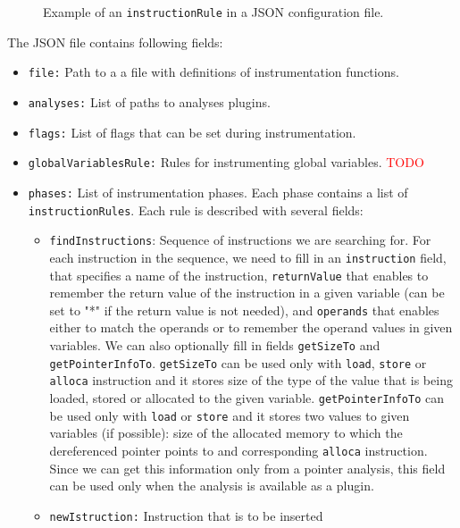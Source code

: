\begin{figure}[h]

\caption{Example of an \texttt{instructionRule} in a JSON configuration file.}
\label{fig:json_example}
\end{figure}

The JSON file contains following fields:

\medskip
\begin{itemize}
\item \texttt{file:} Path to a a file with definitions of instrumentation functions.
\item \texttt{analyses:} List of paths to analyses plugins.
\item \texttt{flags:} List of flags that can be set during instrumentation.
\item \texttt{globalVariablesRule:} Rules for instrumenting global
  variables. \textcolor{red}{TODO}
\item \texttt{phases:} List of instrumentation phases. Each phase contains a
  list of \texttt{instructionRules}. Each rule is described with several fields:
  \begin{itemize}
    \item \texttt{findInstructions}: Sequence of instructions we are searching
    for. For each instruction in the sequence, we need to fill in an
        \texttt{instruction} field, that specifies a name of the instruction,
        \texttt{returnValue} that enables to remember the return value of the
        instruction in a given variable (can be set to "*" if the return value
        is not needed), and \texttt{operands} that enables either to match the
        operands or to remember the operand values in given variables. We can
        also optionally fill in fields \texttt{getSizeTo} and
        \texttt{getPointerInfoTo}. \texttt{getSizeTo} can be used only with
        \texttt{load}, \texttt{store} or \texttt{alloca} instruction and it
        stores size of the type of the value that is being loaded, stored or
        allocated to the given variable. \texttt{getPointerInfoTo} can be used
        only with \texttt{load} or \texttt{store} and it stores two values to
        given variables (if possible): size of the allocated memory to which
        the dereferenced pointer points to and corresponding \texttt{alloca}
        instruction. Since we can get this information only from a pointer
        analysis, this field can be used only when the analysis is available as
        a plugin.
    \item \texttt{newIstruction:} Instruction that is to be inserted

\end{itemize}
\end{itemize}
